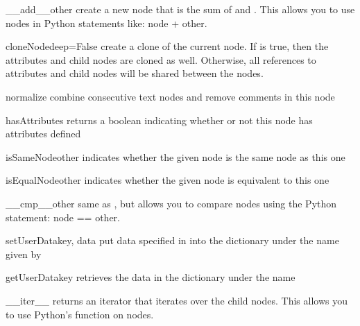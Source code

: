 \documentclass{manual}
\begin{document}
\begin{methoddesc}[Node]{\_\_add\_\_}{other}
create a new node that is the sum of  and .  This
allows you to use nodes in Python statements like: node + other.
\end{methoddesc}

\begin{methoddesc}[Node]{cloneNode}{deep=False}
create a clone of the current node.  If  is true, then the 
attributes and child nodes are cloned as well.  Otherwise, all references
to attributes and child nodes will be shared between the nodes.
\end{methoddesc}

\begin{methoddesc}[Node]{normalize}{}
combine consecutive text nodes and remove comments in this node
\end{methoddesc}

\begin{methoddesc}[Node]{hasAttributes}{}
returns a boolean indicating whether or not this node has attributes defined
\end{methoddesc}

\begin{methoddesc}[Node]{isSameNode}{other}
indicates whether the given node is the same node as this one
\end{methoddesc}

\begin{methoddesc}[Node]{isEqualNode}{other}
indicates whether the given node is equivalent to this one
\end{methoddesc}

\begin{methoddesc}[Node]{\_\_cmp\_\_}{other}
same as , but allows you to compare nodes using the
Python statement: node == other.
\end{methoddesc}

\begin{methoddesc}[Node]{setUserData}{key, data}
put data specified in  into the  dictionary under the
name given by 
\end{methoddesc}

\begin{methoddesc}[Node]{getUserData}{key}
retrieves the data in the  dictionary under the name 
\end{methoddesc}

\begin{methoddesc}[Node]{\_\_iter\_\_}{}
returns an iterator that iterates over the child nodes.  This allows you to
use Python's  function on nodes.
\end{methoddesc}
\end{document}

